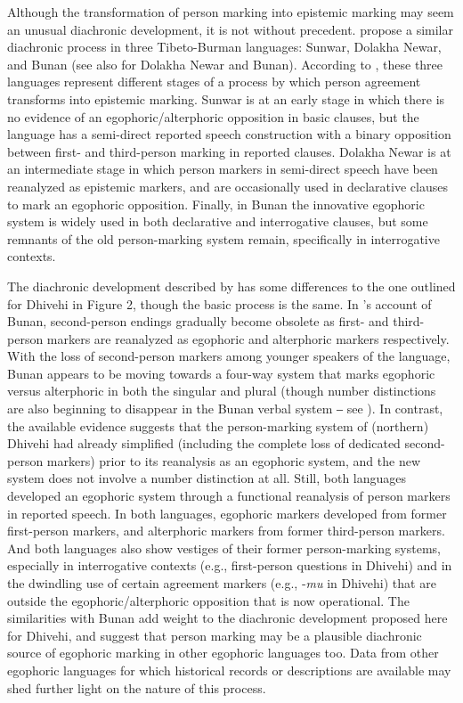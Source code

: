 \documentclass[output=paper]{langsci/langscibook}
\begin{document}
Although the transformation of person marking into epistemic marking may seem an unusual diachronic development, it is not without precedent. \cite{WidmerZemp2017} propose a similar diachronic process in three Tibeto-Burman languages: Sunwar, Dolakha Newar, and Bunan (see also \citealt{Widmer2015} for Dolakha Newar and Bunan). According to \citeauthor{WidmerZemp2017}, these three languages represent different stages of a process by which person agreement transforms into epistemic marking. Sunwar is at an early stage in which there is no evidence of an egophoric/alterphoric opposition in basic clauses, but the language has a semi-direct reported speech construction with a binary opposition between first- and third-person marking in reported clauses. Dolakha Newar is at an intermediate stage in which person markers in semi-direct speech have been reanalyzed as epistemic markers, and are occasionally used in declarative clauses to mark an egophoric opposition. Finally, in Bunan the innovative egophoric system is widely used in both declarative and interrogative clauses, but some remnants of the old person-marking system remain, specifically in interrogative contexts. 

The diachronic development described by \citeauthor{WidmerZemp2017} has some differences to the one outlined for Dhivehi in Figure 2,%
 though the basic process is the same. In \citeauthor{WidmerZemp2017}’s account of Bunan, second-person endings gradually become obsolete as first- and third-person markers are reanalyzed as egophoric and alterphoric markers respectively. With the loss of second-person markers among younger speakers of the language, Bunan appears to be moving towards a four-way system that marks egophoric versus alterphoric in both the singular and plural (though number distinctions are also beginning to disappear in the Bunan verbal system ‒ see \citealt[575–576]{Widmer2014}). In contrast, the available evidence suggests that the person-marking system of (northern) Dhivehi had already simplified (including the complete loss of dedicated second-person markers) prior to its reanalysis as an egophoric system, and the new system does not involve a number distinction at all. Still, both languages developed an egophoric system through a functional reanalysis of person markers in reported speech. In both languages, egophoric markers developed from former first-person markers, and alterphoric markers from former third-person markers. And both languages also show vestiges of their former person-marking systems, especially in interrogative contexts (e.g., first-person questions in Dhivehi) and in the dwindling use of certain agreement markers (e.g., ‑\textit{mu} in Dhivehi) that are outside the egophoric/alterphoric opposition that is now operational. The similarities with Bunan add weight to the diachronic development proposed here for Dhivehi, and suggest that person marking may be a plausible diachronic source of egophoric marking in other egophoric languages too. Data from other egophoric languages for which historical records or descriptions are available may shed further light on the nature of this process.
\end{document}
